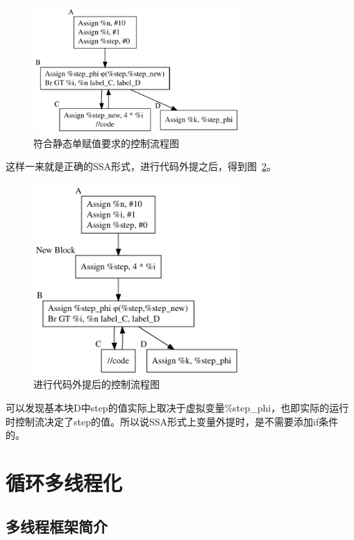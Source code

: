 \begin{figure}[htb]
  \centering
  \includegraphics[width=0.7\textwidth]{figures/codeMotion_phi.pdf}
  \caption{符合静态单赋值要求的控制流程图}
  \label{fig:motion1}
\end{figure}

这样一来就是正确的SSA形式，进行代码外提之后，得到图~\ref{fig:motion2}。

\begin{figure}[htb]
  \centering
  \includegraphics[width=0.7\textwidth]{figures/post_codeMotion.pdf}
  \caption{进行代码外提后的控制流程图}
  \label{fig:motion2}
\end{figure}

可以发现基本块D中step的值实际上取决于虚拟变量\%step\_phi，也即实际的运行时控制流决定了step的值。所以说SSA形式上变量外提时，是不需要添加if条件的。


\section{循环多线程化}

\subsection{多线程框架简介}

